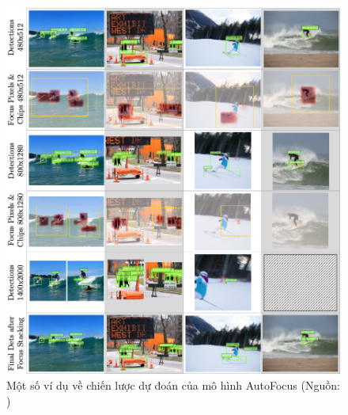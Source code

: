 {    \begin{figure}[H]
        \centering
        \includegraphics[width=15cm] {images/autofocus_results_3}
        \caption{Một số ví dụ về chiến lược dự đoán của mô hình AutoFocus (Nguồn: \cite{najibi2019autofocus})}
        \label{fig:autofocus_results_3}
    \end{figure}

}
